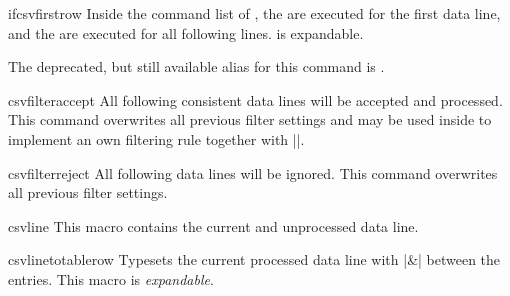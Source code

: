 \documentclass[a4paper,11pt]{ltxdoc}
\begin{document}
\clearpage

\begin{docCommand}[doc updated=2021-06-28]{ifcsvfirstrow}{}
  Inside the command list of , the 
  are executed for the first data line, and the 
  are executed for all following lines.
   is expandable.
\begin{dispExample}
\end{dispExample}
  The deprecated, but still available alias for this command is
  .
\end{docCommand}

\medskip


\begin{docCommand}{csvfilteraccept}{}
  All following consistent data lines will be accepted and processed.
  This command overwrites all previous filter settings and may be used
  inside  to implement
  an own filtering rule together with |\csvfilterreject|.
\begin{dispExample}
\end{dispExample}
\end{docCommand}


\begin{docCommand}{csvfilterreject}{}
  All following data lines will be ignored.
  This command overwrites all previous filter settings.
\end{docCommand}


\begin{docCommand}{csvline}{}
  This macro contains the current and unprocessed data line.
\begin{dispExample}
\end{dispExample}
\end{docCommand}


\clearpage
\begin{docCommand}[doc updated=2022-01-11]{csvlinetotablerow}{}
  Typesets the current processed data line with |&| between the entries.
  This macro is \emph{expandable}.
\end{docCommand}
\end{document}
